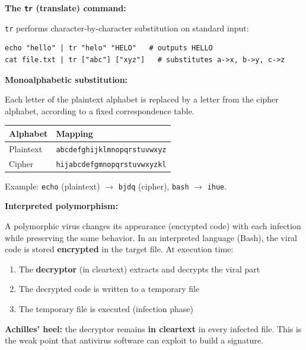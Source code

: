 \documentclass[a4paper,11pt]{article}
\theoremstyle{plain}
\theoremstyle{definition}
\begin{document}
\begin{rappel}
\textbf{The \texttt{tr} (translate) command:}

\texttt{tr} performs character-by-character substitution on standard input:
\begin{lstlisting}[numbers=none]
echo "hello" | tr "helo" "HELO"   # outputs HELLO
cat file.txt | tr ["abc"] ["xyz"]   # substitutes a->x, b->y, c->z
\end{lstlisting}

\medskip
\textbf{Monoalphabetic substitution:}

Each letter of the plaintext alphabet is replaced by a letter from the cipher alphabet, according to a fixed correspondence table.

\begin{center}
\begin{tabular}{ll}
\toprule
\textbf{Alphabet} & \textbf{Mapping} \\
\midrule
Plaintext & \texttt{abcdefghijklmnopqrstuvwxyz} \\
Cipher    & \texttt{hijabcdefgmnopqrstuvwxyzkl} \\
\bottomrule
\end{tabular}
\end{center}

Example: \texttt{echo} (plaintext) $\rightarrow$ \texttt{bjdq} (cipher), \texttt{bash} $\rightarrow$ \texttt{ihue}.

\medskip
\textbf{Interpreted polymorphism:}

A polymorphic virus changes its appearance (encrypted code) with each infection while preserving the same behavior. In an interpreted language (Bash), the viral code is stored \textbf{encrypted} in the target file. At execution time:
\begin{enumerate}
    \item The \textbf{decryptor} (in cleartext) extracts and decrypts the viral part
    \item The decrypted code is written to a temporary file
    \item The temporary file is executed (infection phase)
\end{enumerate}

\medskip
\textbf{Achilles' heel:} the decryptor remains \textbf{in cleartext} in every infected file. This is the weak point that antivirus software can exploit to build a signature.
\end{rappel}
\end{document}
